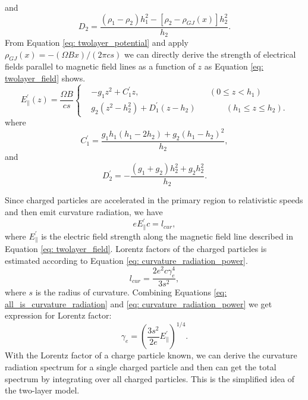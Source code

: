 \documentclass[a4paper, 12pt]{report}
\begin{document}
    and 
    \begin{equation*}
      D_{2} = \frac{\left(\rho_1-\rho_2\right)h_1^2-\left[\rho_2-\rho_{GJ}\left(x\right)\right]h_2^2}{h_2} .
    \end{equation*}
    From Equation \ref{eq: twolayer_potential} and apply 
    $\rho_{GJ}\left(x\right)=-\left(\Omega B x\right)/\left(2\pi cs\right)$ 
    we can directly derive the strength of electrical fields parallel to magnetic field lines as a 
    function of $z$ as Equation \ref{eq: twolayer_field} shows.
    \begin{equation}
      \label{eq: twolayer_field}
        E^{\prime}_{\parallel}\left(z\right) = \frac{\Omega B}{cs}
        \left\{\begin{alignedat}{2}
          & -g_1 z^2 + C_1^{\prime}z ,  &&\left(0 \leq z < h_{1}\right) \\
          & g_2\left(z^2 - h_2^2\right) + D_1^{\prime}\left(z-h_2\right)  &&\qquad \left(h_{1} \leq z \leq h_{2}\right) .
        \end{alignedat}\right.
    \end{equation}
    where 
    \begin{equation*}
      C_{1}^{\prime} = \frac{g_1 h_1 \left(h_1 - 2h_2\right)+ g_2\left(h_1-h_2\right)^2}{h_2} ,
    \end{equation*}
    and 
    \begin{equation*}
      D_{2}^{\prime} = -\frac{\left(g_1 + g_2\right)h_2^2 + g_2 h_2^2}{h_2} .
    \end{equation*}

    Since charged particles are accelerated in the primary region to relativistic speeds 
    and then emit curvature radiation, we have
    \begin{equation}
      \label{eq: all_is_curvature_radiation}
      e E_{\parallel}^{\prime} c = l_{cur} ,
    \end{equation}
    where $E_\parallel^{\prime}$ is the electric field strength along the magnetic field 
    line described in Equation \ref{eq: twolayer_field}.
    Lorentz factors of the charged particles is estimated according to Equation 
    \ref{eq: curvature_radiation_power}.
    \begin{equation}
      \label{eq: curvature_radiation_power}
      l_{cur} = \frac{2 e^2 c \gamma^{4}_{e}}{3s^2} ,
    \end{equation}      
    where $s$ is the radius of curvature. 
    Combining Equations \ref{eq: all_is_curvature_radiation} and 
    \ref{eq: curvature_radiation_power} we get expression for Lorentz factor: 
    \begin{equation}
      \label{eq: gamma_can_be_zero}
      \gamma_{e} = \left(\frac{3s^2}{2e} E_{\parallel}^{\prime}\right)^{1/4} .
    \end{equation}
    With the Lorentz factor of a charge particle known, we can derive the curvature radiation 
    spectrum for a single charged particle and then can get the total spectrum by integrating 
    over all charged particles. This is the simplified idea of the two-layer model. 
  
\end{document}
